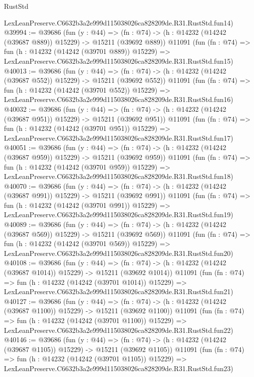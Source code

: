 \begin{lexlean}{RustStd}
\begin{coremodule}
    LexLeanPreserve.C6632b3a2e999d115038026ca828209de.R31.RustStd.fun14)
@39994 := @39686
    (fun (y : @44) =>
    (fn : @74) -> (h : @14232 (@14242 (@39687 @889)) @15229) -> @15211 (@39692 @889))
    @11091
    (fun (fn : @74) =>
    fun (h : @14232 (@14242 (@39701 @889)) @15229) =>
    LexLeanPreserve.C6632b3a2e999d115038026ca828209de.R31.RustStd.fun15)
@40013 := @39686
    (fun (y : @44) =>
    (fn : @74) -> (h : @14232 (@14242 (@39687 @552)) @15229) -> @15211 (@39692 @552))
    @11091
    (fun (fn : @74) =>
    fun (h : @14232 (@14242 (@39701 @552)) @15229) =>
    LexLeanPreserve.C6632b3a2e999d115038026ca828209de.R31.RustStd.fun16)
@40032 := @39686
    (fun (y : @44) =>
    (fn : @74) -> (h : @14232 (@14242 (@39687 @951)) @15229) -> @15211 (@39692 @951))
    @11091
    (fun (fn : @74) =>
    fun (h : @14232 (@14242 (@39701 @951)) @15229) =>
    LexLeanPreserve.C6632b3a2e999d115038026ca828209de.R31.RustStd.fun17)
@40051 := @39686
    (fun (y : @44) =>
    (fn : @74) -> (h : @14232 (@14242 (@39687 @959)) @15229) -> @15211 (@39692 @959))
    @11091
    (fun (fn : @74) =>
    fun (h : @14232 (@14242 (@39701 @959)) @15229) =>
    LexLeanPreserve.C6632b3a2e999d115038026ca828209de.R31.RustStd.fun18)
@40070 := @39686
    (fun (y : @44) =>
    (fn : @74) -> (h : @14232 (@14242 (@39687 @991)) @15229) -> @15211 (@39692 @991))
    @11091
    (fun (fn : @74) =>
    fun (h : @14232 (@14242 (@39701 @991)) @15229) =>
    LexLeanPreserve.C6632b3a2e999d115038026ca828209de.R31.RustStd.fun19)
@40089 := @39686
    (fun (y : @44) =>
    (fn : @74) -> (h : @14232 (@14242 (@39687 @569)) @15229) -> @15211 (@39692 @569))
    @11091
    (fun (fn : @74) =>
    fun (h : @14232 (@14242 (@39701 @569)) @15229) =>
    LexLeanPreserve.C6632b3a2e999d115038026ca828209de.R31.RustStd.fun20)
@40108 := @39686
    (fun (y : @44) =>
    (fn : @74) -> (h : @14232 (@14242 (@39687 @1014)) @15229) -> @15211 (@39692 @1014))
    @11091
    (fun (fn : @74) =>
    fun (h : @14232 (@14242 (@39701 @1014)) @15229) =>
    LexLeanPreserve.C6632b3a2e999d115038026ca828209de.R31.RustStd.fun21)
@40127 := @39686
    (fun (y : @44) =>
    (fn : @74) -> (h : @14232 (@14242 (@39687 @1100)) @15229) -> @15211 (@39692 @1100))
    @11091
    (fun (fn : @74) =>
    fun (h : @14232 (@14242 (@39701 @1100)) @15229) =>
    LexLeanPreserve.C6632b3a2e999d115038026ca828209de.R31.RustStd.fun22)
@40146 := @39686
    (fun (y : @44) =>
    (fn : @74) -> (h : @14232 (@14242 (@39687 @1105)) @15229) -> @15211 (@39692 @1105))
    @11091
    (fun (fn : @74) =>
    fun (h : @14232 (@14242 (@39701 @1105)) @15229) =>
    LexLeanPreserve.C6632b3a2e999d115038026ca828209de.R31.RustStd.fun23)

\end{coremodule}
\end{lexlean}
